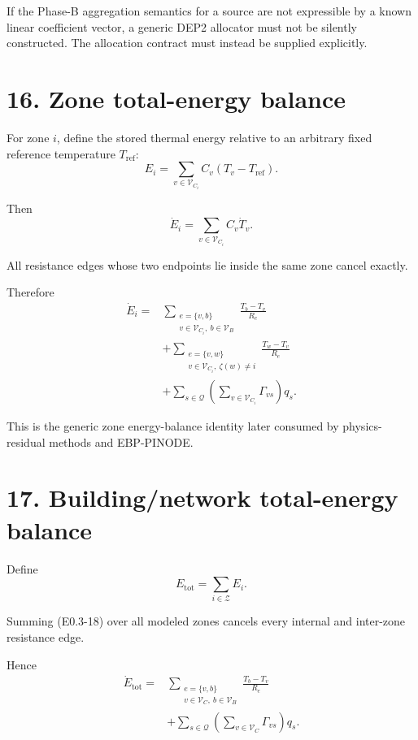 \documentclass[11pt]{article}
\newcommand{\Vc}{\mathcal{V}_{C}}
\newcommand{\Vb}{\mathcal{V}_{B}}
\newcommand{\Qset}{\mathcal{Q}}
\newcommand{\Zset}{\mathcal{Z}}
\begin{document}
If the Phase-B aggregation semantics for a source are not expressible by a
known linear coefficient vector, a generic DEP2 allocator must not be silently
constructed.  The allocation contract must instead be supplied explicitly.

\section*{16. Zone total-energy balance}

For zone $i$, define the stored thermal energy relative to an arbitrary fixed
reference temperature $T_{\mathrm{ref}}$:
\[
\boxed{
E_i
=
\sum_{v\in\Vc_i}
C_v(T_v-T_{\mathrm{ref}}).
}
\tag{E0.3-17}
\]

Then
\[
\dot E_i
=
\sum_{v\in\Vc_i}C_v\dot T_v.
\]

All resistance edges whose two endpoints lie inside the same zone cancel
exactly.

Therefore
\[
\boxed{
\begin{aligned}
\dot E_i
={}&
\sum_{\substack{e=\{v,b\}\\
v\in\Vc_i,\ b\in\Vb}}
\frac{T_b-T_v}{R_e}
\\
&+
\sum_{\substack{e=\{v,w\}\\
v\in\Vc_i,\ \zeta(w)\ne i}}
\frac{T_w-T_v}{R_e}
\\
&+
\sum_{s\in\Qset}
\left(
\sum_{v\in\Vc_i}\Gamma_{vs}
\right)q_s.
\end{aligned}
}
\tag{E0.3-18}
\]

This is the generic zone energy-balance identity later consumed by
physics-residual methods and EBP-PINODE.

\section*{17. Building/network total-energy balance}

Define
\[
E_{\mathrm{tot}}
=
\sum_{i\in\Zset}E_i.
\]

Summing (E0.3-18) over all modeled zones cancels every internal and inter-zone
resistance edge.

Hence
\[
\boxed{
\begin{aligned}
\dot E_{\mathrm{tot}}
={}&
\sum_{\substack{e=\{v,b\}\\
v\in\Vc,\ b\in\Vb}}
\frac{T_b-T_v}{R_e}
\\
&+
\sum_{s\in\Qset}
\left(
\sum_{v\in\Vc}\Gamma_{vs}
\right)q_s.
\end{aligned}
}
\tag{E0.3-19}
\]
\end{document}
